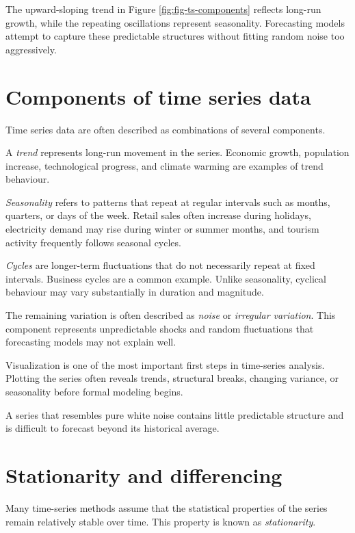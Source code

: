\documentclass[
  11pt,
  oneside]{book}
\begin{document}
The upward-sloping trend in Figure \ref{fig:fig-ts-components} reflects long-run growth, while the repeating oscillations represent seasonality. Forecasting models attempt to capture these predictable structures without fitting random noise too aggressively.

\section{Components of time series data}\label{components-of-time-series-data}

Time series data are often described as combinations of several components.

A \emph{trend} represents long-run movement in the series. Economic growth, population increase, technological progress, and climate warming are examples of trend behaviour.

\emph{Seasonality} refers to patterns that repeat at regular intervals such as months, quarters, or days of the week. Retail sales often increase during holidays, electricity demand may rise during winter or summer months, and tourism activity frequently follows seasonal cycles.

\emph{Cycles} are longer-term fluctuations that do not necessarily repeat at fixed intervals. Business cycles are a common example. Unlike seasonality, cyclical behaviour may vary substantially in duration and magnitude.

The remaining variation is often described as \emph{noise} or \emph{irregular variation}. This component represents unpredictable shocks and random fluctuations that forecasting models may not explain well.

Visualization is one of the most important first steps in time-series analysis. Plotting the series often reveals trends, structural breaks, changing variance, or seasonality before formal modeling begins.

A series that resembles pure white noise contains little predictable structure and is difficult to forecast beyond its historical average.

\section{Stationarity and differencing}\label{stationarity-and-differencing}

Many time-series methods assume that the statistical properties of the series remain relatively stable over time. This property is known as \emph{stationarity}.
\end{document}
